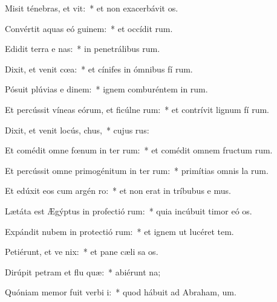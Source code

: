 \item Misit ténebras, et vit:~* et non exacerbávit  os.
\item Convértit aquas eó  guinem:~* et occídit  rum.
\item Edidit terra e nas:~* in penetrálibus  rum.
\item Dixit, et venit cœa:~* et cínifes in ómnibus fí rum.
\item Pósuit plúvias e dinem:~* ignem comburéntem in  rum.
\item Et percússit víneas eórum, et ficúlne rum:~* et contrívit lignum fí rum.
\item Dixit, et venit locús,  chus,~* cujus   rus:
\item Et comédit omne fœnum in ter rum:~* et comédit omnem fructum  rum.
\item Et percússit omne primogénitum in ter rum:~* primítias omnis la rum.
\item Et edúxit eos cum argén  ro:~* et non erat in tríbubus e mus.
\item Lætáta est Ægýptus in profectió rum:~* quia incúbuit timor eó  os.
\item Expándit nubem in protectió rum:~* et ignem ut lucéret   tem.
\item Petiérunt, et ve nix:~* et pane cæli sa os.
\item Dirúpit petram et flu quæ:~* abiérunt   na;
\item Quóniam memor fuit verbi  i:~* quod hábuit ad Abraham,  um.
